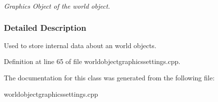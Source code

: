 \begin{DoxyCompactItemize}
\begin{DoxyCompactList}\small\item\em Graphics Object of the world object. \item\end{DoxyCompactList}\end{DoxyCompactItemize}


\subsubsection{Detailed Description}
Used to store internal data about an world objects. 

Definition at line 65 of file worldobjectgraphicssettings.cpp.



The documentation for this class was generated from the following file:\begin{DoxyCompactItemize}
\item 
worldobjectgraphicssettings.cpp\end{DoxyCompactItemize}
